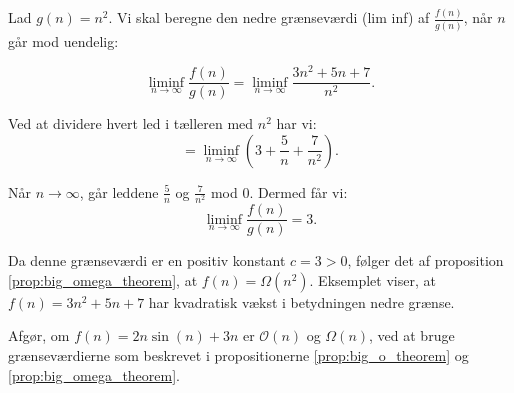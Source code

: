            \begin{solution}
            Lad \( g(n) = n^2 \). Vi skal beregne den nedre grænseværdi (lim inf) af \( \frac{f(n)}{g(n)} \), når \( n \) går mod uendelig:
            
            \[
            \liminf_{n \to \infty} \frac{f(n)}{g(n)} = \liminf_{n \to \infty} \frac{3n^2 + 5n + 7}{n^2}.
            \]
            
            Ved at dividere hvert led i tælleren med \( n^2 \) har vi:
            \[
            = \liminf_{n \to \infty} \left( 3 + \frac{5}{n} + \frac{7}{n^2} \right).
            \]
            
            Når \( n \to \infty \), går leddene \( \frac{5}{n} \) og \( \frac{7}{n^2} \) mod \( 0 \). Dermed får vi:
            \[
            \liminf_{n \to \infty} \frac{f(n)}{g(n)} = 3.
            \]
            
            Da denne grænseværdi er en positiv konstant \( c = 3 > 0 \), følger det af proposition \ref{prop:big_omega_theorem}, at \( f(n) = \Omega(n^2) \). Eksemplet viser, at \( f(n) = 3n^2 + 5n + 7 \) har kvadratisk vækst i betydningen nedre grænse. \end{solution}

            \begin{example}
                Afgør, om \( f(n) = 2n \sin(n) + 3n \) er \( \mathcal{O}(n) \) og \( \Omega(n) \), ved at bruge grænseværdierne som beskrevet i propositionerne \ref{prop:big_o_theorem} og \ref{prop:big_omega_theorem}. \end{example}
                
